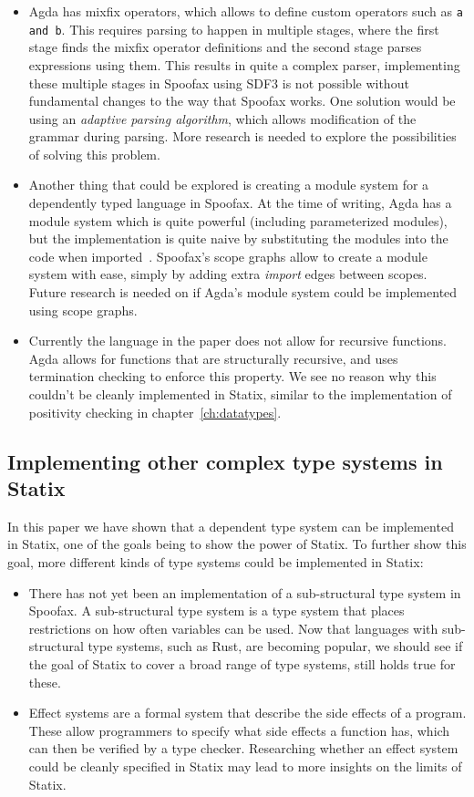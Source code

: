 \begin{itemize}
	\item Agda has mixfix operators, which allows to define custom operators such as \verb|a and b|. This requires parsing to happen in multiple stages, where the first stage finds the mixfix operator definitions and the second stage parses expressions using them. This results in quite a complex parser, implementing these multiple stages in Spoofax using SDF3 is not possible without fundamental changes to the way that Spoofax works. One solution would be using an \emph{adaptive parsing algorithm}, which allows modification of the grammar during parsing. More research is needed to explore the possibilities of solving this problem.
	\item Another thing that could be explored is creating a module system for a dependently typed language in Spoofax. At the time of writing, Agda has a module system which is quite powerful (including parameterized modules), but the implementation is quite naive by substituting the modules into the code when imported~\cite[Modules]{agda}. Spoofax's scope graphs allow to create a module system with ease, simply by adding extra \emph{import} edges between scopes. Future research is needed on if Agda's module system could be implemented using scope graphs.
	\item Currently the language in the paper does not allow for recursive functions. Agda allows for functions that are structurally recursive, and uses termination checking to enforce this property. We see no reason why this couldn't be cleanly implemented in Statix, similar to the implementation of positivity checking in chapter~\ref{ch:datatypes}.
\end{itemize}

\subsection*{Implementing other complex type systems in Statix}

In this paper we have shown that a dependent type system can be implemented in Statix, one of the goals being to show the power of Statix. To further show this goal, more different kinds of type systems could be implemented in Statix:

\begin{itemize}
	\item There has not yet been an implementation of a sub-structural type system in Spoofax. A sub-structural type system is a type system that places restrictions on how often variables can be used. Now that languages with sub-structural type systems, such as Rust, are becoming popular, we should see if the goal of Statix to cover a broad range of type systems, still holds true for these. 
	\item Effect systems are a formal system that describe the side effects of a program. These allow programmers to specify what side effects a function has, which can then be verified by a type checker. Researching whether an effect system could be cleanly specified in Statix may lead to more insights on the limits of Statix.
\end{itemize}